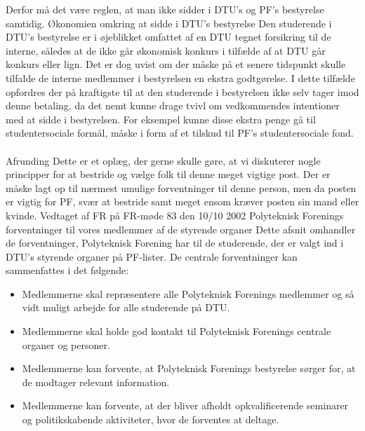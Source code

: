 Derfor må det være reglen, at man ikke sidder i DTU’s og PF’s bestyrelse samtidig.
Økonomien omkring at sidde i DTU’s bestyrelse
Den studerende i DTU’s bestyrelse er i øjeblikket omfattet af en DTU tegnet forsikring til de interne, således at de ikke
går økonomisk konkurs i tilfælde af at DTU går konkurs eller lign. Det er dog uvist om der måske på et senere tidspunkt
skulle tilfalde de interne medlemmer i bestyrelsen en ekstra godtgørelse. I dette tilfælde opfordres der på kraftigste
til at den studerende i bestyrelsen ikke selv tager imod denne betaling, da det nemt kunne drage tvivl om
vedkommendes intentioner med at sidde i bestyrelsen. For eksempel kunne disse ekstra penge gå til studentersociale
formål, måske i form af et tilskud til PF’s studentersociale fond.
\\
\\
Afrunding
Dette er et oplæg, der gerne skulle gøre, at vi diskuterer nogle principper for at bestride og vælge folk til denne meget
vigtige post. Der er måske lagt op til nærmest umulige forventninger til denne person, men da posten er vigtig for PF,
svær at bestride samt meget ensom kræver posten sin mand eller kvinde.
Vedtaget af FR på FR-møde 83 den 10/10 2002
Polyteknisk Forenings forventninger til vores medlemmer af de styrende organer
Dette afsnit omhandler de forventninger, Polyteknisk Forening har til de studerende, der er valgt ind i DTU’s styrende
organer på PF-lister.
De centrale forventninger kan sammenfattes i det følgende:
\begin{itemize}
\item Medlemmerne skal repræsentere alle Polyteknisk Forenings medlemmer og så vidt muligt arbejde
for alle studerende på DTU.
\item Medlemmerne skal holde god kontakt til Polyteknisk Forenings centrale organer og personer.
\item Medlemmerne kan forvente, at Polyteknisk Forenings bestyrelse sørger for, at de modtager relevant
information.
\item Medlemmerne kan forvente, at der bliver afholdt opkvalificerende seminarer og politikskabende
aktiviteter, hvor de forventes at deltage.
\end{itemize}

